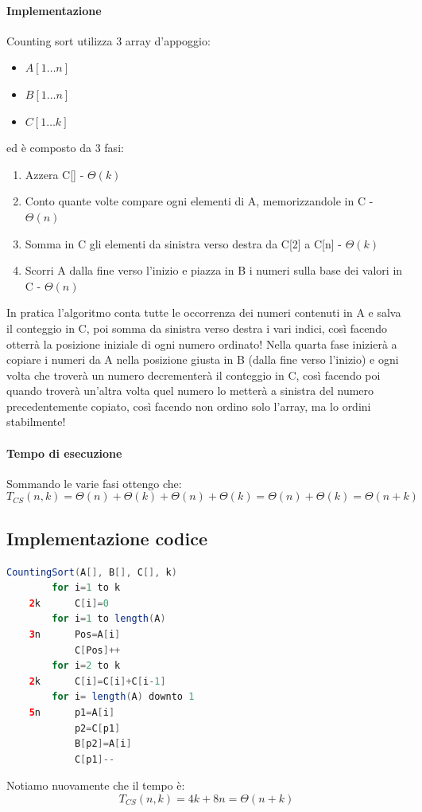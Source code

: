\paragraph*{Implementazione}
Counting sort utilizza 3 array d'appoggio:
\begin{itemize}
    \item $A[1\dots n]$
    \item $B[1\dots n]$
    \item $C[1\dots k]$
\end{itemize} 
ed è composto da 3 fasi:
\begin{enumerate}
    \item Azzera C[] - $\Theta(k)$ 
    \item Conto quante volte compare ogni elementi di A, memorizzandole in C - $\Theta(n)$
    \item Somma in C gli elementi da sinistra verso destra da C[2] a C[n] - $\Theta(k)$
    \item Scorri A dalla fine verso l'inizio e piazza in B i numeri sulla base dei valori in C - $\Theta(n)$
\end{enumerate}
In pratica l'algoritmo conta tutte le occorrenza dei numeri contenuti in A e salva il conteggio
in C, poi somma da sinistra verso destra i vari indici, così facendo otterrà la posizione iniziale
di ogni numero ordinato! Nella quarta fase inizierà a copiare i numeri da A nella posizione giusta
in B (dalla fine verso l'inizio) e ogni volta che troverà un numero decrementerà il conteggio in C,
così facendo poi quando troverà un'altra volta quel numero lo metterà a sinistra del numero
precedentemente copiato, così facendo non ordino solo l'array, ma lo ordini stabilmente!\\
\paragraph*{Tempo di esecuzione} Sommando le varie fasi ottengo che:
\begin{equation*}
    T_{CS}(n,k)=\Theta(n)+ \Theta(k)+ \Theta(n)+ \Theta(k)=\Theta(n)+\Theta(k)=\Theta(n+k)
\end{equation*}
\subsection{Implementazione codice}
\begin{lstlisting}[language=Java]
    CountingSort(A[], B[], C[], k)
        for i=1 to k
    2k      C[i]=0
        for i=1 to length(A)
    3n      Pos=A[i]
            C[Pos]++
        for i=2 to k
    2k      C[i]=C[i]+C[i-1]
        for i= length(A) downto 1
    5n      p1=A[i]
            p2=C[p1]
            B[p2]=A[i]
            C[p1]--
\end{lstlisting}
Notiamo nuovamente che il tempo è:
\begin{equation*}
    T_{CS}(n,k)=4k+8n = \Theta(n+k)
\end{equation*}
